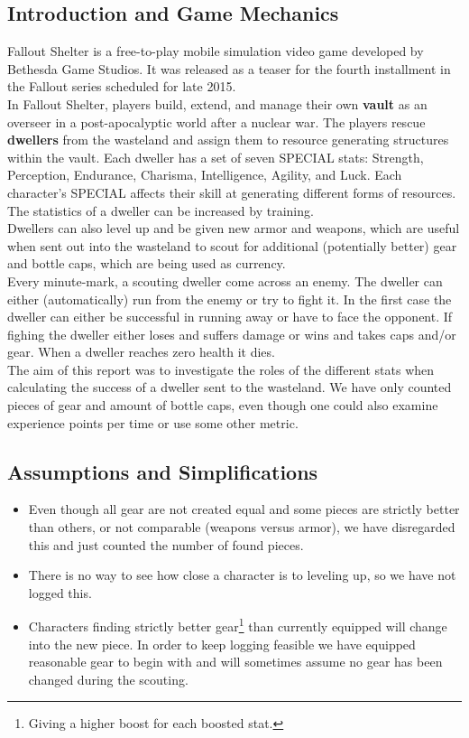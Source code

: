 \subsection{Introduction and Game Mechanics}
Fallout Shelter is a free-to-play mobile simulation video game developed by Bethesda Game Studios. It was released as a teaser for the fourth installment in the Fallout series scheduled for late 2015.\\

In Fallout Shelter, players build, extend, and manage their own \textbf{vault} as an overseer in a post-apocalyptic world after a nuclear war. The players rescue \textbf{dwellers} from the wasteland and assign them to resource generating structures within the vault. Each dweller has a set of seven SPECIAL stats: Strength, Perception, Endurance, Charisma, Intelligence, Agility, and Luck. Each character's SPECIAL affects their skill at generating different forms of resources. The statistics of a dweller can be increased by training.\\

Dwellers can also level up and be given new armor and weapons, which are useful when sent out into the wasteland to scout for additional (potentially better) gear and bottle caps, which are being used as currency.\\

Every minute-mark, a scouting dweller come across an enemy. The dweller can either (automatically) run from the enemy or try to fight it. In the first case the dweller can either be successful in running away or have to face the opponent. If fighing the dweller either loses and suffers damage or wins and takes caps and/or gear. When a dweller reaches zero health it dies.\\

The aim of this report was to investigate the roles of the different stats when calculating the success of a dweller sent to the wasteland. We have only counted pieces of gear and amount of bottle caps, even though one could also examine experience points per time or use some other metric.

\subsection{Assumptions and Simplifications}
\begin{itemize}
\item Even though all gear are not created equal and some pieces are strictly better than others, or not comparable (weapons versus armor), we have disregarded this and just counted the number of found pieces.
\item There is no way to see how close a character is to leveling up, so we have not logged this.
\item Characters finding strictly better gear\footnote{Giving a higher boost for each boosted stat.} than currently equipped will change into the new piece. In order to keep logging feasible we have equipped reasonable gear to begin with and will sometimes assume no gear has been changed during the scouting.
\end{itemize}

